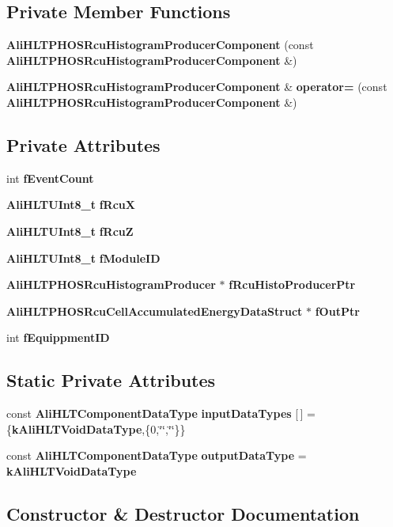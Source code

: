 \subsection*{Private Member Functions}
\begin{CompactItemize}
\item 
{\bf Ali\-HLTPHOSRcu\-Histogram\-Producer\-Component} (const {\bf Ali\-HLTPHOSRcu\-Histogram\-Producer\-Component} \&)
\item 
{\bf Ali\-HLTPHOSRcu\-Histogram\-Producer\-Component} \& {\bf operator=} (const {\bf Ali\-HLTPHOSRcu\-Histogram\-Producer\-Component} \&)
\end{CompactItemize}
\subsection*{Private Attributes}
\begin{CompactItemize}
\item 
int {\bf f\-Event\-Count}
\item 
{\bf Ali\-HLTUInt8\_\-t} {\bf f\-Rcu\-X}
\item 
{\bf Ali\-HLTUInt8\_\-t} {\bf f\-Rcu\-Z}
\item 
{\bf Ali\-HLTUInt8\_\-t} {\bf f\-Module\-ID}
\item 
{\bf Ali\-HLTPHOSRcu\-Histogram\-Producer} $\ast$ {\bf f\-Rcu\-Histo\-Producer\-Ptr}
\item 
{\bf Ali\-HLTPHOSRcu\-Cell\-Accumulated\-Energy\-Data\-Struct} $\ast$ {\bf f\-Out\-Ptr}
\item 
int {\bf f\-Equippment\-ID}
\end{CompactItemize}
\subsection*{Static Private Attributes}
\begin{CompactItemize}
\item 
const {\bf Ali\-HLTComponent\-Data\-Type} {\bf input\-Data\-Types} [$\,$] = \{{\bf k\-Ali\-HLTVoid\-Data\-Type},\{0,\char`\"{}\char`\"{},\char`\"{}\char`\"{}\}\}
\item 
const {\bf Ali\-HLTComponent\-Data\-Type} {\bf output\-Data\-Type} = {\bf k\-Ali\-HLTVoid\-Data\-Type}
\end{CompactItemize}


\subsection{Constructor \& Destructor Documentation}
